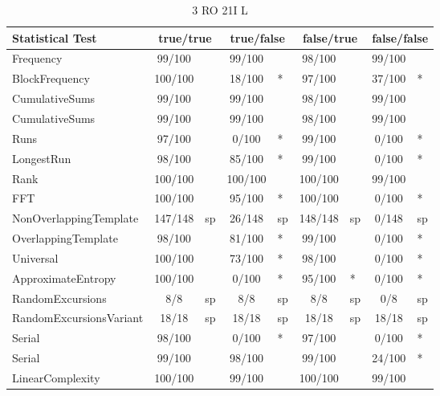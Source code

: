 \begin{table}[H]
\centering
\caption{3 RO 21I L}
\label{tab:nist_22_3RO_21I_L}
\begin{tabular}{|l|c|l|c|l|c|l|c|l|}
\hline
\textbf{Statistical Test} & \multicolumn{2}{c|}{\textbf{true/true}} & \multicolumn{2}{c|}{\textbf{true/false}} & \multicolumn{2}{c|}{\textbf{false/true}} & \multicolumn{2}{c|}{\textbf{false/false}} \\ \hline
Frequency               &  99/100 &     &  99/100 &     &  98/100 &     &  99/100 &     \\ \hline
BlockFrequency          & 100/100 &     &  18/100 & *   &  97/100 &     &  37/100 & *   \\ \hline
CumulativeSums          &  99/100 &     &  99/100 &     &  98/100 &     &  99/100 &     \\ \hline
CumulativeSums          &  99/100 &     &  99/100 &     &  98/100 &     &  99/100 &     \\ \hline
Runs                    &  97/100 &     &   0/100 & *   &  99/100 &     &   0/100 & *   \\ \hline
LongestRun              &  98/100 &     &  85/100 & *   &  99/100 &     &   0/100 & *   \\ \hline
Rank                    & 100/100 &     & 100/100 &     & 100/100 &     &  99/100 &     \\ \hline
FFT                     & 100/100 &     &  95/100 & *   & 100/100 &     &   0/100 & *   \\ \hline
NonOverlappingTemplate  & 147/148 & sp  &  26/148 & sp  & 148/148 & sp  &   0/148 & sp  \\ \hline
OverlappingTemplate     &  98/100 &     &  81/100 & *   &  99/100 &     &   0/100 & *   \\ \hline
Universal               & 100/100 &     &  73/100 & *   &  98/100 &     &   0/100 & *   \\ \hline
ApproximateEntropy      & 100/100 &     &   0/100 & *   &  95/100 & *   &   0/100 & *   \\ \hline
RandomExcursions        &     8/8 & sp  &     8/8 & sp  &     8/8 & sp  &     0/8 & sp  \\ \hline
RandomExcursionsVariant &   18/18 & sp  &   18/18 & sp  &   18/18 & sp  &   18/18 & sp  \\ \hline
Serial                  &  98/100 &     &   0/100 & *   &  97/100 &     &   0/100 & *   \\ \hline
Serial                  &  99/100 &     &  98/100 &     &  99/100 &     &  24/100 & *   \\ \hline
LinearComplexity        & 100/100 &     &  99/100 &     & 100/100 &     &  99/100 &     \\ \hline
\end{tabular}
\end{table}

